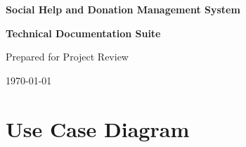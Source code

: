 \documentclass{article}
\begin{document}
\begin{titlepage}
    \centering
    \vspace*{2cm}
    {\Huge\bfseries Social Help and Donation Management System\par}
    \vspace{1cm}
    {\Large\bfseries Technical Documentation Suite\par}
    \vspace{2cm}
    {\large Prepared for Project Review\par}
    \vfill
    {\large \today \par}
\end{titlepage}

\tableofcontents
\newpage

\section{Use Case Diagram}
\end{document}
